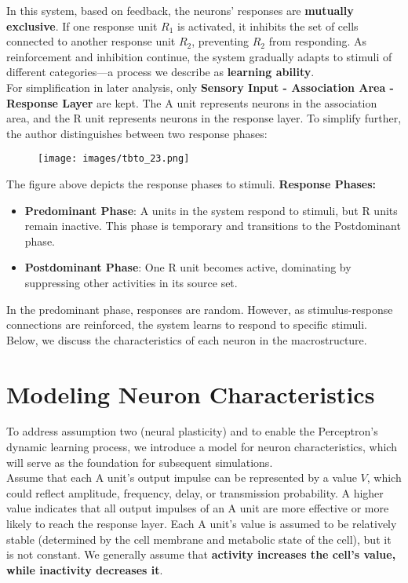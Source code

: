 \documentclass[11p,oneside]{book}
\begin{document}
In this system, based on feedback, the neurons’ responses are \textbf{mutually exclusive}. If one response unit $R_1$ is activated, it inhibits the set of cells connected to another response unit $R_2$, preventing $R_2$ from responding. As reinforcement and inhibition continue, the system gradually adapts to stimuli of different categories—a process we describe as \textbf{learning ability}. \\

For simplification in later analysis, only \textbf{Sensory Input - Association Area - Response Layer} are kept. The A unit represents neurons in the association area, and the R unit represents neurons in the response layer. To simplify further, the author distinguishes between two response phases:

\begin{figure}[H]
    \centering
    \texttt{[image: images/tbto\_23.png]}
\end{figure}

The figure above depicts the response phases to stimuli.
\textbf{Response Phases:}
\begin{itemize}
    \item \textbf{Predominant Phase}: A units in the system respond to stimuli, but R units remain inactive. This phase is temporary and transitions to the Postdominant phase.
    \item \textbf{Postdominant Phase}: One R unit becomes active, dominating by suppressing other activities in its source set.
\end{itemize}

In the predominant phase, responses are random. However, as stimulus-response connections are reinforced, the system learns to respond to specific stimuli. Below, we discuss the characteristics of each neuron in the macrostructure.

\section*{Modeling Neuron Characteristics}

To address assumption two (neural plasticity) and to enable the Perceptron's dynamic learning process, we introduce a model for neuron characteristics, which will serve as the foundation for subsequent simulations. \\

Assume that each A unit’s output impulse can be represented by a value $V$, which could reflect amplitude, frequency, delay, or transmission probability. A higher value indicates that all output impulses of an A unit are more effective or more likely to reach the response layer. Each A unit’s value is assumed to be relatively stable (determined by the cell membrane and metabolic state of the cell), but it is not constant. We generally assume that \textbf{activity increases the cell’s value, while inactivity decreases it}. \\
\end{document}
